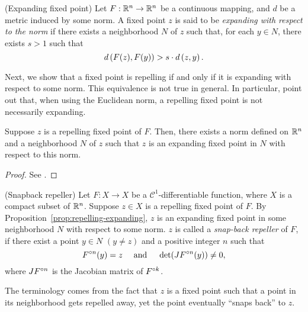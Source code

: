 \documentclass[12pt,draft,twoside]{book}
\begin{document}
\begin{definition}
  (Expanding fixed point)
  Let $F: \mathbb{R}^n \to \mathbb{R}^n$ be a continuous mapping, and $d$ be a metric induced by some norm.
  A fixed point $z$ is said to be \textit{expanding with respect to the norm} if there exists a neighborhood $N$ of $z$ such that, for each $y \in N$, there exists $s > 1$ such that 
  \begin{equation*}
    d\left( F(z), F(y) \right) > s \cdot d\left( z,y \right).
  \end{equation*}
\end{definition}
Next, we show that a fixed point is repelling if and only if it is expanding with respect to some norm.
This equivalence is not true in general.
In particular, \citet{shi} point out that, when using the Euclidean norm, a repelling fixed point is not necessarily expanding.

\begin{proposition}
  Suppose $z$ is a repelling fixed point of $F$.
  Then, there exists a norm defined on $\mathbb{R}^n$ and a neighborhood $N$ of $z$ such that $z$ is an expanding fixed point in $N$ with respect to this norm.
  \begin{proof}
    See \citet[p. 278-281]{hirsch}.
  \end{proof}
  \label{prop:repelling-expanding}
\end{proposition}

\begin{definition}
  (Snapback repeller)
  Let $F: X\to X$ be a $\mathcal{C}^1$-differentiable function, where $X$ is a compact subset of $\mathbb{R}^n$.
  Suppose $z \in X$ is a repelling fixed point of $F$.
  By Proposition~\ref{prop:repelling-expanding}, $z$ is an expanding fixed point in some neighborhood $N$ with respect to some norm.
  $z$ is called a \textit{snap-back repeller} of $F$, if there exist a point $y \in N$ $(y \neq z)$ and a positive integer $n$ such that 
  \begin{equation*}
   F^{\circ n}(y) = z \quad\mbox{ and }\quad \det(JF^{\circ n}(y)) \neq 0,
  \end{equation*}
  where $JF^{\circ n}$ is the Jacobian matrix of $F^{\circ k}$.
\end{definition}
The terminology comes from the fact that $z$ is a fixed point such that a point in its neighborhood gets repelled away, yet the point eventually ``snaps back'' to $z$.
\end{document}
